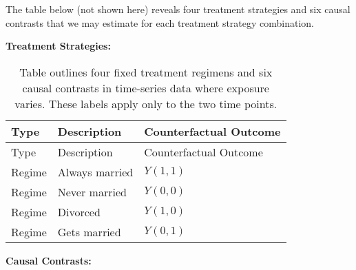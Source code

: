 \documentclass[
  single column]{article}
\begin{document}
The table below (not shown here) reveals four treatment strategies and
six causal contrasts that we may estimate for each treatment strategy
combination.

\textbf{Treatment Strategies:}

\begin{longtable}[]{@{}lll@{}}
\caption{Table outlines four fixed treatment regimens and six causal
contrasts in time-series data where exposure varies. These labels apply
only to the two time
points.}\label{tbl-regimens-marriage}\tabularnewline
\toprule\noalign{}
Type & Description & Counterfactual Outcome \\
\midrule\noalign{}
\endfirsthead
\toprule\noalign{}
Type & Description & Counterfactual Outcome \\
\midrule\noalign{}
\endhead
\bottomrule\noalign{}
\endlastfoot
Regime & Always married & \(Y(1,1)\) \\
Regime & Never married & \(Y(0,0)\) \\
Regime & Divorced & \(Y(1,0)\) \\
Regime & Gets married & \(Y(0,1)\) \\
\end{longtable}

\textbf{Causal Contrasts:}
\end{document}

